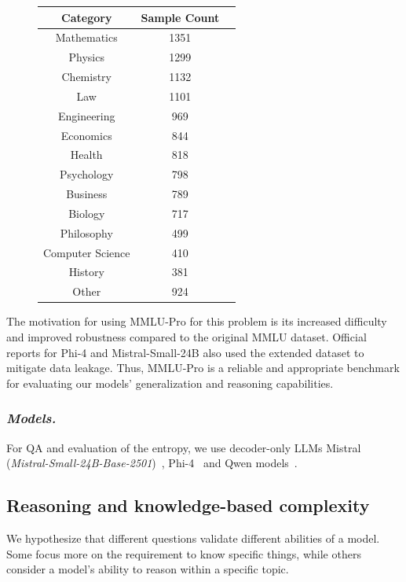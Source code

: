 \begin{figure}
    \footnotesize\setlength{\tabcolsep}{2.8pt}
    \begin{tabular}{|c|c|c|}
    \hline
        Category & Sample Count \\
        \hline
        Mathematics & 1351 \\
        Physics & 1299 \\
        Chemistry & 1132 \\
        Law & 1101 \\
        Engineering & 969 \\
        Economics & 844 \\
        Health & 818 \\
        Psychology & 798 \\
        Business & 789 \\
        Biology & 717 \\
        Philosophy & 499 \\
        Computer Science & 410 \\
        History & 381 \\
        Other & 924 \\
        \hline
    \end{tabular}
    \label{tab:mmlu_pro_distr}
\end{figure}

The motivation for using MMLU-Pro for this problem is its increased difficulty and improved robustness compared to the original MMLU dataset. 
Official reports for Phi-4 and Mistral-Small-24B also used the extended dataset to mitigate data leakage.
Thus, MMLU-Pro is a reliable and appropriate benchmark for evaluating our models' generalization and reasoning capabilities.

\subsubsection{\emph{Models.}} For QA and evaluation of the entropy, we use decoder-only LLMs Mistral (\textit{Mistral-Small-24B-Base-2501})~\cite{jiang2023mistral}, Phi-4~\cite{abdin2024phi} and Qwen models~\cite{qwen2025qwen25technicalreport}. 

\subsection{Reasoning and knowledge-based complexity}

We hypothesize that different questions validate different abilities of a model. Some focus more on the requirement to know specific things, while others consider a model's ability to reason within a specific topic.  

